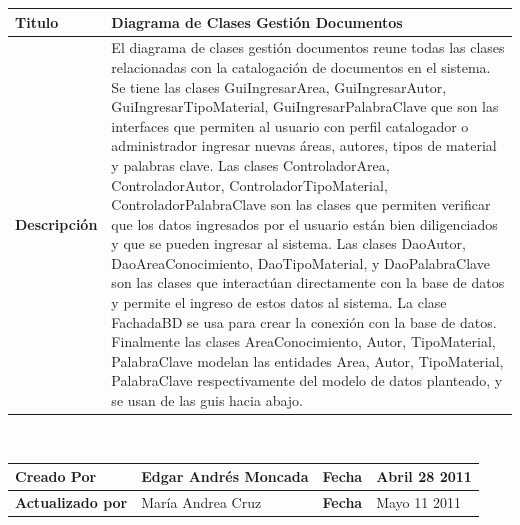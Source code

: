 		
	\begin{tabular}{|p{5cm}|p{11cm}|}\hline
	{\bf Titulo} & {Diagrama de Clases Gestión Documentos}\\
	\hline
	{\bf Descripción} & {El diagrama de clases gestión documentos reune todas las
	clases relacionadas con la catalogación de documentos en el sistema.\newline
	Se tiene las clases GuiIngresarArea, GuiIngresarAutor, GuiIngresarTipoMaterial, 
	GuiIngresarPalabraClave que son las interfaces que permiten al usuario con perfil
	catalogador o administrador ingresar nuevas áreas, autores, tipos de material y palabras
	clave.\newline
	Las clases ControladorArea, ControladorAutor, ControladorTipoMaterial, ControladorPalabraClave
	son las clases que permiten verificar que los datos ingresados por el usuario están bien 
	diligenciados y que se pueden ingresar al sistema. Las clases DaoAutor, DaoAreaConocimiento,
	DaoTipoMaterial, y DaoPalabraClave son las clases que interactúan directamente con la 
	base de datos y permite el ingreso de estos datos al sistema. La clase FachadaBD se usa
	para crear la conexión con la base de datos.\newline
	Finalmente las clases AreaConocimiento, Autor, TipoMaterial, PalabraClave modelan las entidades
	Area, Autor, TipoMaterial, PalabraClave respectivamente del modelo de datos planteado, y se 
	usan de las guis hacia abajo.}\\
	\hline
	\end{tabular}\\[.5cm]
		
	\begin{tabular}{|p{3.5cm}|p{4.5cm}|p{2.5cm}|p{4.5cm}|}\hline
	{\bf Creado Por} & {Edgar Andrés Moncada} & {\bf Fecha} & {Abril 28 2011}\\
	\hline
	{\bf Actualizado por} & {María Andrea Cruz} & {\bf Fecha} & {Mayo 11 2011}\\
	\hline
	\end{tabular}


